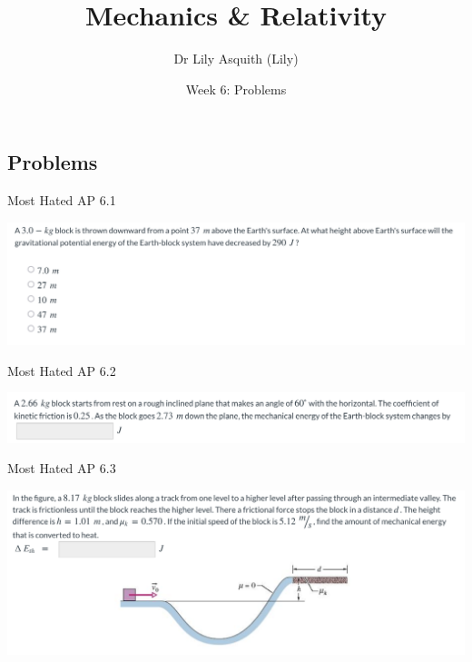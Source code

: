 


% 
\title[ Mechanics \& Relativity]{Mechanics \& Relativity}
\author[Dr Lily Asquith (Lily)]{ Dr Lily Asquith (Lily)}
\date[Week 6: Problems]{Week 6: Problems}





\begin{frame}
\titlepage
\end{frame} 







 \subsection{Problems}
 
 \begin{frame}{Most Hated AP 6.1}
\small

\includegraphics[scale=0.35]{mosthated}

\vspace{10cm}
\end{frame}


\begin{frame}{Most Hated AP 6.2}
\small

\includegraphics[scale=0.35]{mosthated2}

\vspace{10cm}
\end{frame}

\begin{frame}{Most Hated AP 6.3}
\small

\includegraphics[scale=0.35]{mosthated3}

\vspace{10cm}
\end{frame}

